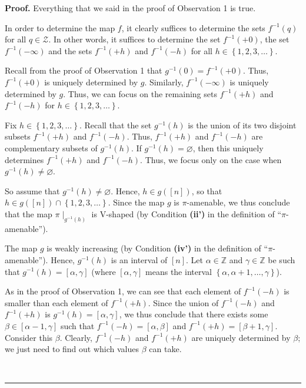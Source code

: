 \documentclass[numbers=enddot,12pt,final,onecolumn,notitlepage]{scrartcl}%
\theoremstyle{definition}
\newenvironment{proof}[1][Proof]{\noindent\textbf{#1.} }{\ \rule{0.5em}{0.5em}}
\begin{document}
\begin{proof}
Everything that we said in the proof of Observation 1 is true.

In order to determine the map $f$, it clearly suffices to determine the sets
$f^{-1}\left(  q\right)  $ for all $q\in\mathcal{Z}$. In other words, it
suffices to determine the set $f^{-1}\left(  +0\right)  $, the set
$f^{-1}\left(  -\infty\right)  $ and the sets $f^{-1}\left(  +h\right)  $ and
$f^{-1}\left(  -h\right)  $ for all $h\in\left\{  1,2,3,\ldots\right\}  $.

Recall from the proof of Observation 1 that $g^{-1}\left(  0\right)
=f^{-1}\left(  +0\right)  $. Thus, $f^{-1}\left(  +0\right)  $ is uniquely
determined by $g$. Similarly, $f^{-1}\left(  -\infty\right)  $ is uniquely
determined by $g$. Thus, we can focus on the remaining sets $f^{-1}\left(
+h\right)  $ and $f^{-1}\left(  -h\right)  $ for $h\in\left\{  1,2,3,\ldots
\right\}  $.

Fix $h\in\left\{  1,2,3,\ldots\right\}  $. Recall that the set $g^{-1}\left(
h\right)  $ is the union of its two disjoint subsets $f^{-1}\left(  +h\right)
$ and $f^{-1}\left(  -h\right)  $. Thus, $f^{-1}\left(  +h\right)  $ and
$f^{-1}\left(  -h\right)  $ are complementary subsets of $g^{-1}\left(
h\right)  $. If $g^{-1}\left(  h\right)  =\varnothing$, then this uniquely
determines $f^{-1}\left(  +h\right)  $ and $f^{-1}\left(  -h\right)  $. Thus,
we focus only on the case when $g^{-1}\left(  h\right)  \neq\varnothing$.

So assume that $g^{-1}\left(  h\right)  \neq\varnothing$. Hence, $h\in
g\left(  \left[  n\right]  \right)  $, so that $h\in g\left(  \left[
n\right]  \right)  \cap\left\{  1,2,3,\ldots\right\}  $. Since the map $g$ is
$\pi$-amenable, we thus conclude that the map $\pi\mid_{g^{-1}\left(
h\right)  }$ is V-shaped (by Condition \textbf{(ii')} in the definition of
\textquotedblleft$\pi$-amenable\textquotedblright).

The map $g$ is weakly increasing (by Condition \textbf{(iv')} in the
definition of \textquotedblleft$\pi$-amenable\textquotedblright). Hence,
$g^{-1}\left(  h\right)  $ is an interval of $\left[  n\right]  $. Let
$\alpha\in\mathbb{Z}$ and $\gamma\in\mathbb{Z}$ be such that $g^{-1}\left(
h\right)  =\left[  \alpha,\gamma\right]  $ (where $\left[  \alpha
,\gamma\right]  $ means the interval $\left\{  \alpha,\alpha+1,\ldots
,\gamma\right\}  $).

As in the proof of Observation 1, we can see that each element of
$f^{-1}\left(  -h\right)  $ is smaller than each element of $f^{-1}\left(
+h\right)  $. Since the union of $f^{-1}\left(  -h\right)  $ and
$f^{-1}\left(  +h\right)  $ is $g^{-1}\left(  h\right)  =\left[  \alpha
,\gamma\right]  $, we thus conclude that there exists some $\beta\in\left[
\alpha-1,\gamma\right]  $ such that $f^{-1}\left(  -h\right)  =\left[
\alpha,\beta\right]  $ and $f^{-1}\left(  +h\right)  =\left[  \beta
+1,\gamma\right]  $. Consider this $\beta$. Clearly, $f^{-1}\left(  -h\right)
$ and $f^{-1}\left(  +h\right)  $ are uniquely determined by $\beta$; we just
need to find out which values $\beta$ can take.


\end{proof}
\end{document}

